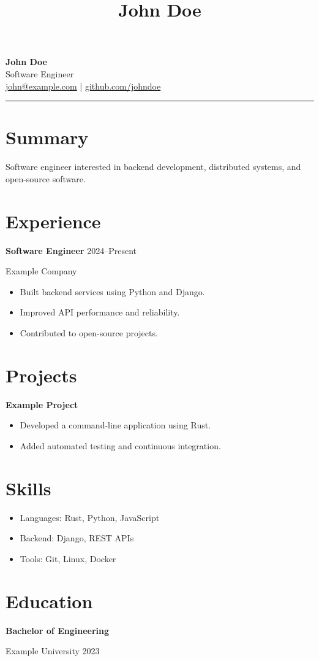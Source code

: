 \documentclass[11pt,a4paper]{article}
\title{John Doe}
\author{}
\date{}
\begin{document}
\begin{center}
    {\LARGE \textbf{John Doe}} \\[6pt]

    Software Engineer \\[4pt]

    \href{mailto:john@example.com}{john@example.com}
    \quad | \quad
    \href{https://github.com/johndoe}{github.com/johndoe}
\end{center}

\hrule

\vspace{10pt}

\section*{Summary}

Software engineer interested in backend development, distributed systems,
and open-source software.

\section*{Experience}

\textbf{Software Engineer} \hfill 2024--Present

Example Company

\begin{itemize}
    \item Built backend services using Python and Django.
    \item Improved API performance and reliability.
    \item Contributed to open-source projects.
\end{itemize}

\section*{Projects}

\textbf{Example Project}

\begin{itemize}
    \item Developed a command-line application using Rust.
    \item Added automated testing and continuous integration.
\end{itemize}

\section*{Skills}

\begin{itemize}
    \item Languages: Rust, Python, JavaScript
    \item Backend: Django, REST APIs
    \item Tools: Git, Linux, Docker
\end{itemize}

\section*{Education}

\textbf{Bachelor of Engineering}

Example University \hfill 2023
\end{document}

